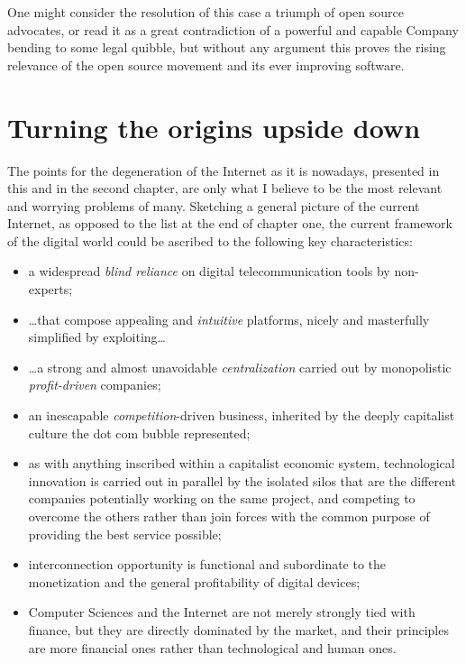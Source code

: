 \documentclass[
  a4paper,
]{book}
\providecommand{\tightlist}{%
  \setlength{\itemsep}{0pt}\setlength{\parskip}{0pt}}
\begin{document}
One might consider the resolution of this case a triumph of open source advocates, or read it as a great contradiction of a powerful and capable Company bending to some legal quibble, but without any argument this proves the rising relevance of the open source movement and its ever improving software.

\hypertarget{turning-the-origins-upside-down}{%
\section{Turning the origins upside down}\label{turning-the-origins-upside-down}}

The points for the degeneration of the Internet as it is nowadays, presented in this and in the second chapter, are only what I believe to be the most relevant and worrying problems of many. Sketching a general picture of the current Internet, as opposed to the list at the end of chapter one, the current framework of the digital world could be ascribed to the following key characteristics:

\begin{itemize}
\tightlist
\item
  a widespread \emph{blind reliance} on digital telecommunication tools by non-experts;
\item
  \ldots that compose appealing and \emph{intuitive} platforms, nicely and masterfully simplified by exploiting\ldots{}
\item
  \ldots a strong and almost unavoidable \emph{centralization} carried out by monopolistic \emph{profit-driven} companies;
\item
  an inescapable \emph{competition}-driven business, inherited by the deeply capitalist culture the dot com bubble represented;
\item
  as with anything inscribed within a capitalist economic system, technological innovation is carried out in parallel by the isolated silos that are the different companies potentially working on the same project, and competing to overcome the others rather than join forces with the common purpose of providing the best service possible;
\item
  interconnection opportunity is functional and subordinate to the monetization and the general profitability of digital devices;
\item
  Computer Sciences and the Internet are not merely strongly tied with finance, but they are directly dominated by the market, and their principles are more financial ones rather than technological and human ones.
\end{itemize}
\end{document}

